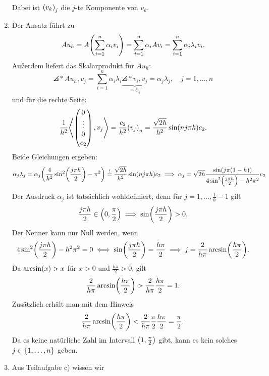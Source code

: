 \documentclass{exercise}
\begin{document}
\begin{enumerate}
\begin{align*}
        \end{align*}
        Dabei ist \(\parentheses*{v_k}_j\) die \(j\)-te Komponente von \(v_k\).
        \item Der Ansatz führt zu
        \[
            Au_h = A\parentheses*{\sum_{i = 1}^n \alpha_i v_i} = \sum_{i = 1}^n \alpha_i Av_i = \sum_{i = 1}^n \alpha_i \lambda_i v_i.
        \]
        Außerdem liefert das Skalarprodukt für \(Au_h\):
        \[
            \angles*{Au_h, v_j} = \sum_{i = 1}^n \alpha_i \lambda_i \underbrace{\angles*{v_i, v_j}}_{= \delta_{ij}} = \alpha_j \lambda_j, \quad j = 1, \ldots, n
        \]
        und für die rechte Seite:
        \[
            \frac{1}{h^2}\angles*{\begin{pmatrix}
                0\\
                \vdots\\
                0\\
                c_2
            \end{pmatrix}, v_j} = \frac{c_2}{h^2}\parentheses*{v_j}_n = \frac{\sqrt{2h}}{h^2}\sin\parentheses*{nj\pi h}c_2.
        \]
        Beide Gleichungen ergeben:
        \[
            \alpha_j \lambda_j = \alpha_j\parentheses*{\frac{4}{h^2}\sin^2\parentheses*{\frac{j\pi h}{2}} - \pi^2} \stackrel{!}{=} \frac{\sqrt{2h}}{h^2}\sin\parentheses*{nj\pi h}c_2 \implies \alpha_j = \sqrt{2h}\frac{\sin\parentheses*{j\pi\parentheses*{1 - h}}}{4\sin^2\parentheses*{\frac{j\pi h}{2}} - h^2 \pi^2}c_2
        \]
        Der Ausdruck \(\alpha_j\) ist tatsächlich wohldefiniert, denn für \(j = 1, \ldots, \frac{1}{h} - 1\) gilt
        \[
            \frac{j\pi h}{2} \in \parentheses*{0, \frac{\pi}{2}} \implies \sin\parentheses*{\frac{j\pi h}{2}} > 0.
        \]
        Der Nenner kann nur Null werden, wenn
        \[
            4\sin^2\parentheses*{\frac{j\pi h}{2}} - h^2 \pi^2 = 0 \iff \sin\parentheses*{\frac{j\pi h}{2}} = \frac{h\pi}{2} \implies j = \frac{2}{h\pi}\arcsin\parentheses*{\frac{h\pi}{2}}.
        \]
        Da \(\arcsin\parentheses*{x} > x\) für \(x > 0\) und \(\frac{h\pi}{2} > 0\), gilt
        \[
            \frac{2}{h\pi}\arcsin\parentheses*{\frac{h\pi}{2}} > \frac{2}{h\pi}\frac{h\pi}{2} = 1.
        \]
        Zusätzlich erhält man mit dem Hinweis
        \[
            \frac{2}{h\pi}\arcsin\parentheses*{\frac{h\pi}{2}} < \frac{2}{h\pi}\frac{\pi}{2}\frac{h\pi}{2} = \frac{\pi}{2}.
        \]
        Da es keine natürliche Zahl im Intervall \(\parentheses*{1, \frac{\pi}{2}}\) gibt, kann es kein solches \(j \in \braces*{1, \ldots, n}\) geben.
        \item Aus Teilaufgabe c) wissen wir

\end{enumerate}
\end{document}
